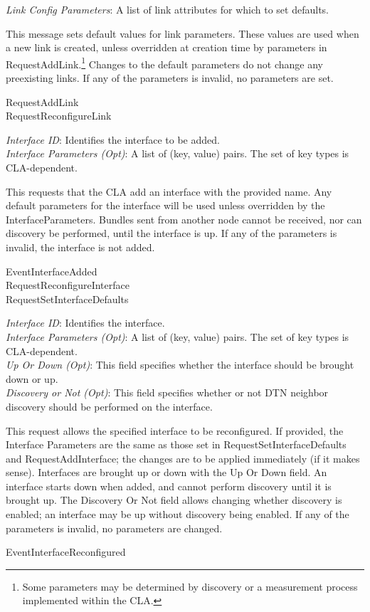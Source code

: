 {
\metP
    {\em Link Config Parameters}: A list of link attributes for which to set
    defaults.

\metD
    This message sets default values for link parameters. These values are
    used when a new link is created, unless overridden at creation time by
    parameters in RequestAddLink.\footnote{Some parameters may be determined
    by discovery or a measurement process implemented within the CLA.} Changes 
    to the default parameters do not change any
    preexisting links. If any of the parameters is invalid, no parameters are
    set.

\metR
    RequestAddLink\\
    RequestReconfigureLink
}

{
\metP
    {\em Interface ID}: Identifies the interface to be added.\\
    {\em Interface Parameters (Opt)}: A list of (key, value) pairs. The set
    of key types is CLA-dependent.

\metD
    This requests that the CLA add an interface with the provided name. Any
    default parameters for the interface will be used unless overridden by
    the InterfaceParameters. Bundles sent from another node cannot be
    received, nor can discovery be performed, until the interface is up.
    If any of the parameters is invalid, the interface is not added.

\metR
    EventInterfaceAdded\\
    RequestReconfigureInterface\\
    RequestSetInterfaceDefaults
}

{
\metP
    {\em Interface ID}: Identifies the interface.\\
    {\em Interface Parameters (Opt)}: A list of (key, value) pairs. The set
    of key types is CLA-dependent.\\
    {\em Up Or Down (Opt)}: This field specifies whether the interface should
    be brought down or up.\\
    {\em Discovery or Not (Opt)}: This field specifies whether or not DTN
    neighbor discovery should be performed on the interface.

\metD
    This request allows the specified interface to be reconfigured. If
    provided, the Interface Parameters are the same as those set in
    RequestSetInterfaceDefaults and RequestAddInterface; the changes are to be
    applied immediately (if it makes sense). Interfaces are brought up or
    down with the Up Or Down field. An interface starts down when added, and
    cannot perform discovery until it is brought up. The Discovery Or Not
    field allows changing whether discovery is enabled; an interface may be
    up without discovery being enabled. If any of the parameters is invalid, no
    parameters are changed.

\metR
    EventInterfaceReconfigured
}

